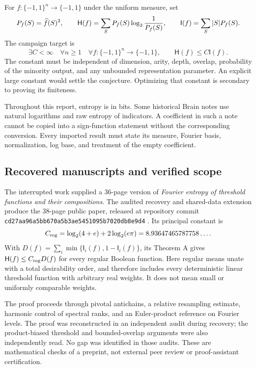 \documentclass[11pt]{article}
\newcommand{\HH}{\mathsf H}\newcommand{\I}{\mathsf I}
\newcommand{\bits}{\{-1,1\}}\newcommand{\KL}{\operatorname{D}}
\newcommand{\Creg}{C_{\rm reg}}\newcommand{\Rcost}{\mathcal R_f}
\begin{document}
For $f:\bits^n\to\bits$ under the uniform measure, set
\[
 P_f(S)=\wh f(S)^2,\qquad
 \HH(f)=\sum_S P_f(S)\log_2\frac1{P_f(S)},\qquad
 \I(f)=\sum_S |S|P_f(S).
\]
The campaign target is
\begin{equation}\label{eq:full}
 \exists C<\infty\quad\forall n\ge1\quad\forall f:\bits^n\to\bits,
 \qquad \HH(f)\le C\I(f).
\end{equation}
The constant must be independent of dimension, arity, depth, overlap, probability of the minority output, and any unbounded representation parameter. An explicit large constant would settle the conjecture. Optimizing that constant is secondary to proving its finiteness.

Throughout this report, entropy is in bits. Some historical Brain notes use natural logarithms and raw entropy of indicators. A coefficient in such a note cannot be copied into a sign-function statement without the corresponding conversion. Every imported result must state its measure, Fourier basis, normalization, log base, and treatment of the empty coefficient.

\subsection{Recovered manuscripts and verified scope}

The interrupted work supplied a 36-page version of \emph{Fourier entropy of threshold functions and their compositions}. The audited recovery and shared-data extension produce the 38-page public paper, released at repository commit \texttt{cd27aa96a5bb670a5b3ae5451095b7020db8e9d4} \cite{Threshold}. Its principal constant is
\[
 \Creg=\log_2(4+e)+2\log_2(e\pi)
       =8.93647465787758\ldots.
\]
With $D(f)=\sum_i\min\{\I_i(f),1-\I_i(f)\}$, its Theorem A gives $\HH(f)\le\Creg D(f)$ for every regular Boolean function. Here regular means unate with a total desirability order, and therefore includes every deterministic linear threshold function with arbitrary real weights. It does not mean small or uniformly comparable weights.

The proof proceeds through pivotal antichains, a relative resampling estimate, harmonic control of spectral ranks, and an Euler-product reference on Fourier levels. The proof was reconstructed in an independent audit during recovery; the product-biased threshold and bounded-overlap arguments were also independently read. No gap was identified in those audits. These are mathematical checks of a preprint, not external peer review or proof-assistant certification.
\end{document}
